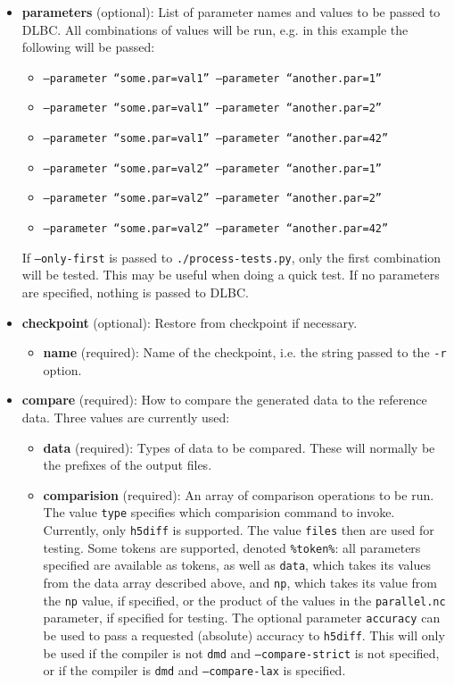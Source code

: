 \documentclass{article}
\begin{document}
\begin{itemize}
\item \textbf{parameters} (optional): List of parameter names and values to be passed to DLBC. All combinations of values will be run, e.g. in this example the following will be passed:
\begin{itemize}
\item \texttt{--parameter ``some.par=val1'' --parameter ``another.par=1''}
\item \texttt{--parameter ``some.par=val1'' --parameter ``another.par=2''}
\item \texttt{--parameter ``some.par=val1'' --parameter ``another.par=42''}
\item \texttt{--parameter ``some.par=val2'' --parameter ``another.par=1''}
\item \texttt{--parameter ``some.par=val2'' --parameter ``another.par=2''}
\item \texttt{--parameter ``some.par=val2'' --parameter ``another.par=42''}
\end{itemize}
If \texttt{--only-first} is passed to \texttt{./process-tests.py}, only the first combination will be tested. This may be useful when doing a quick test. If no parameters are specified, nothing is passed to DLBC.
\item \textbf{checkpoint} (optional): Restore from checkpoint if necessary.
\begin{itemize}
\item \textbf{name} (required): Name of the checkpoint, i.e. the string passed to the \texttt{-r} option.
\end{itemize}
\item \textbf{compare} (required): How to compare the generated data to the reference data. Three values are currently used:
\begin{itemize}
\item \textbf{data} (required): Types of data to be compared. These will normally be the prefixes of the output files.
\item \textbf{comparision} (required): An array of comparison operations to be run. The value \texttt{type} specifies which comparision command to invoke. Currently, only \texttt{h5diff} is supported. The value \texttt{files} then are used for testing. Some tokens are supported, denoted \texttt{\%token\%}: all parameters specified are available as tokens, as well as \texttt{data}, which takes its values from the data array described above, and \texttt{np}, which takes its value from the \texttt{np} value, if specified, or the product of the values in the \texttt{parallel.nc} parameter, if specified for testing. The optional parameter \texttt{accuracy} can be used to pass a requested (absolute) accuracy to \texttt{h5diff}. This will only be used if the compiler is not \texttt{dmd} and \texttt{--compare-strict} is not specified, or if the compiler is \texttt{dmd} and \texttt{--compare-lax} is specified.

\end{itemize}
\end{itemize}
\end{document}
